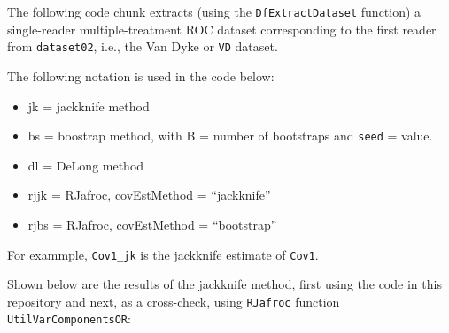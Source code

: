 \documentclass[
]{book}
\newenvironment{Shaded}{\begin{snugshade}}{\end{snugshade}}
\newcommand{\CommentTok}[1]{\textcolor[rgb]{0.56,0.35,0.01}{\textit{#1}}}
\newcommand{\DataTypeTok}[1]{\textcolor[rgb]{0.13,0.29,0.53}{#1}}
\newcommand{\DecValTok}[1]{\textcolor[rgb]{0.00,0.00,0.81}{#1}}
\newcommand{\KeywordTok}[1]{\textcolor[rgb]{0.13,0.29,0.53}{\textbf{#1}}}
\newcommand{\NormalTok}[1]{#1}
\newcommand{\OperatorTok}[1]{\textcolor[rgb]{0.81,0.36,0.00}{\textbf{#1}}}
\newcommand{\StringTok}[1]{\textcolor[rgb]{0.31,0.60,0.02}{#1}}
\providecommand{\tightlist}{%
  \setlength{\itemsep}{0pt}\setlength{\parskip}{0pt}}
\begin{document}
The following code chunk extracts (using the \texttt{DfExtractDataset} function) a single-reader multiple-treatment ROC dataset corresponding to the first reader from \texttt{dataset02}, i.e., the Van Dyke or \texttt{VD} dataset.

\begin{Shaded}
\end{Shaded}

The following notation is used in the code below:

\begin{itemize}
\tightlist
\item
  jk = jackknife method
\item
  bs = boostrap method, with B = number of bootstraps and \texttt{seed} = value.
\item
  dl = DeLong method
\item
  rjjk = RJafroc, covEstMethod = ``jackknife''
\item
  rjbs = RJafroc, covEstMethod = ``bootstrap''
\end{itemize}

For exammple, \texttt{Cov1\_jk} is the jackknife estimate of \texttt{Cov1}.

Shown below are the results of the jackknife method, first using the code in this repository and next, as a cross-check, using \texttt{RJafroc} function \texttt{UtilVarComponentsOR}:
\end{document}
